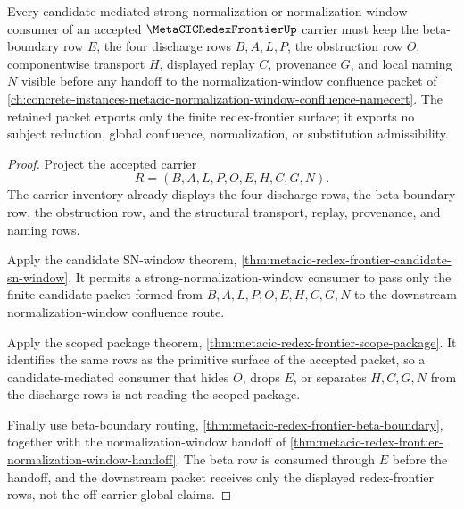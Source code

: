 \begin{theorem}
\label{thm:metacic-redex-frontier-obstruction-retention}
Every candidate-mediated strong-normalization or normalization-window consumer
of an accepted $\MetaCICRedexFrontierUp$ carrier must keep the beta-boundary row
$E$, the four discharge rows $B,A,L,P$, the obstruction row $O$, componentwise
transport $H$, displayed replay $C$, provenance $G$, and local naming $N$
visible before any handoff to the normalization-window confluence packet of
\autoref{ch:concrete-instances-metacic-normalization-window-confluence-namecert}.
The retained packet exports only the finite redex-frontier surface; it exports
no subject reduction, global confluence, normalization, or substitution
admissibility.
\end{theorem}
\begin{proof}
Project the accepted carrier
$$
R=(B,A,L,P,O,E,H,C,G,N).
$$
The carrier inventory already displays the four discharge rows, the
beta-boundary row, the obstruction row, and the structural transport, replay,
provenance, and naming rows.

Apply the candidate SN-window theorem,
\autoref{thm:metacic-redex-frontier-candidate-sn-window}. It permits a
strong-normalization-window consumer to pass only the finite candidate packet
formed from $B,A,L,P,O,E,H,C,G,N$ to the downstream normalization-window
confluence route.

Apply the scoped package theorem,
\autoref{thm:metacic-redex-frontier-scope-package}. It identifies the same rows
as the primitive surface of the accepted packet, so a candidate-mediated
consumer that hides $O$, drops $E$, or separates $H,C,G,N$ from the discharge
rows is not reading the scoped package.

Finally use beta-boundary routing,
\autoref{thm:metacic-redex-frontier-beta-boundary}, together with the
normalization-window handoff of
\autoref{thm:metacic-redex-frontier-normalization-window-handoff}. The beta row
is consumed through $E$ before the handoff, and the downstream packet receives
only the displayed redex-frontier rows, not the off-carrier global claims.
\end{proof}

